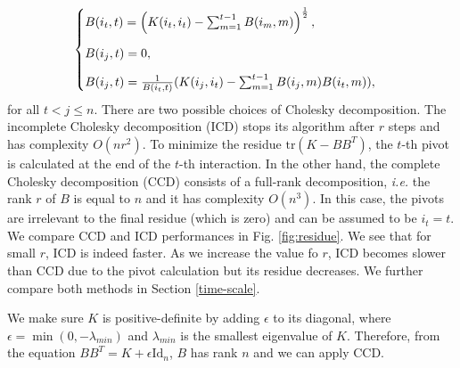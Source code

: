 \begin{align}
\begin{cases}
\vspace{3 mm}
B(i_t, t) = \left(K(i_t,i_t)-\sum_{m=1}^{t-1} B(i_{m},m)  \right)^{\frac{1}{2}},\\
\vspace{3 mm}
B(i_j,t) = 0,\\
B(i_j, t) = \frac{1}{B(i_t,t)}(K(i_j,i_t)  -\sum_{m=1}^{t-1}B(i_j,m)B(i_t,m)), \end{cases}\label{icd:algo}
\end{align}
for all $t<j\le n$. There are two possible choices of Cholesky decomposition. The incomplete Cholesky decomposition (ICD) stops its algorithm after $r$ steps and has complexity $O(nr^2)$. 
To minimize the residue $\mathrm{tr}(K-BB^T)$, the $t$-th pivot is calculated at the end of the $t$-th interaction. 
In the other hand, the complete Cholesky decomposition (CCD) consists of a full-rank decomposition, \textit{i.e.} the rank $r$ of $B$ is equal to $n$ and it has complexity $O(n^3)$. 
In this case, the pivots are irrelevant to the final residue (which is zero) and can be assumed to be $i_t=t$. %
We compare CCD and ICD performances in Fig. \ref{fig:residue}. We see that for small $r$, ICD is indeed faster. As we increase the value fo $r$, ICD becomes slower than CCD due to the pivot calculation but its residue decreases. We further compare both methods in Section \ref{time-scale}.

We make sure $K$ is positive-definite by adding $\epsilon$ to its diagonal, where $\epsilon=\min(0,-\lambda_{min})$ and $\lambda_{min}$ is the smallest eigenvalue of $K$. Therefore, from the equation $BB^T=K+\epsilon\mathrm{Id}_n$, $B$ has rank $n$ and we can apply CCD.

